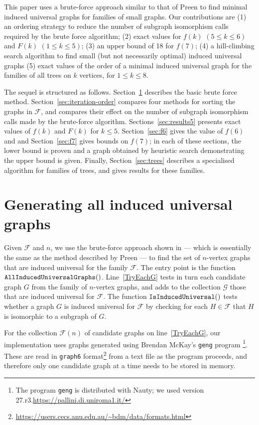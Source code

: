\documentclass[12pt]{article}
\newcommand{\calF}{\ensuremath{\mathcal{F}}}
\newcommand{\calG}{\ensuremath{\mathcal{G}}}
\newcommand{\lineref}[1]{line~\ref{#1}}
\newcommand{\Lineref}[1]{Line~\ref{#1}}
\begin{document}
This paper uses a brute-force approach similar to that of Preen to find minimal
induced universal graphs for families of small graphs.  Our contributions
are (1) an ordering strategy to reduce the number of subgraph isomorphism
calls required by the brute force algorithm; (2) exact values for $f(k)$ $(5 \leq k \leq 6)$
and $F(k)$ $(1 \leq k \leq 5)$; (3) an upper bound of 18 for $f(7)$; (4) a hill-climbing
search algorithm to find small (but not necessarily optimal) induced universal graphs
(5) exact values of the order of a minimal induced universal graph
for the families of all trees on $k$ vertices, for $1 \leq k \leq 8$.

The sequel is structured as follows.
Section~\ref{sec:method} describes the basic brute force method.
Section~\ref{sec:iteration-order} compares four methods for sorting
the graphs in $\calF$, and compares their effect on the number of subgraph
isomorphism calls made by the brute-force algorithm.
Sections~\ref{sec:results5} presents exact
values of $f(k)$ and $F(k)$ for $k \leq 5$.
Section~\ref{sec:f6} gives the value of $f(6)$ and and
Section~\ref{sec:f7} gives bounds on $f(7)$; in each of these sections, the lower
bound is proven and a graph obtained by heuristic search demonstrating the
upper bound is given.  Finally, Section~\ref{sec:trees} describes a specialised
algorithm for families of trees, and gives results for
these families.

\section{Generating all induced universal graphs}\label{sec:method}

Given $\calF$ and $n$,
we use the brute-force approach
shown in  --- which is essentially the same as the method
described by Preen \cite{preen_math_se} ---
to find the set of
$n$-vertex graphs that are induced universal for the family $\calF$.
The entry point is the function $\FuncSty{AllInducedUniversalGraphs}()$.
\Lineref{TryEachG} tests in turn each candidate graph $G$ from the family
of $n$-vertex graphs, and adds to the collection $\calG$ those that are induced universal
for $\calF$.  The function $\FuncSty{IsInducedUniversal}()$ tests
whether a graph $G$ is induced universal for $\calF$ by checking for
each $H \in \calF$ that $H$ is isomorphic to a subgraph of $G$.

For the collection $\calF(n)$ of candidate graphs on \lineref{TryEachG}, our
implementation uses graphs generated using Brendan McKay's \texttt{geng}
program \cite{DBLP:journals/jal/McKay98}
\footnote{The program \texttt{geng} is distributed
with Nauty; we used version 27.r3.\url{https://pallini.di.uniroma1.it/}}.
These are read in \texttt{graph6}
format\footnote{\url{https://users.cecs.anu.edu.au/~bdm/data/formats.html}}
from a text file as the program proceeds, and therefore only one candidate
graph at a time needs to be stored in memory.
\end{document}
